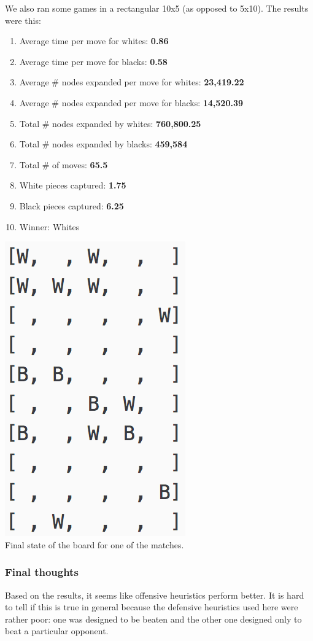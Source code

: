 \documentclass[11pt]{article}
\begin{document}
We also ran some games in a rectangular 10x5 (as opposed to 5x10). The results were this:
\begin{enumerate}
\item Average time per move for whites: \textbf{0.86}
\item Average time per move for blacks: \textbf{0.58}
\item Average \# nodes expanded per move for whites: \textbf{23,419.22}
\item Average \# nodes expanded per move for blacks:  \textbf{14,520.39}
\item Total \# nodes expanded by whites: \textbf{760,800.25}
\item Total \# nodes expanded by blacks: \textbf{459,584}
\item Total \# of moves: \textbf{65.5}
\item White pieces captured: \textbf{1.75}
\item Black pieces captured: \textbf{6.25}
\item Winner: Whites
\end{enumerate}
\begin{center}
\includegraphics[scale=1]{part2/ab-o1-vs-ab-d1-rect10x5.png}\\
Final state of the board for one of the matches.
\end{center}

\subsubsection*{Final thoughts}
Based on the results, it seems like offensive heuristics perform better. It is hard to tell if this is true in general because the defensive heuristics used here were rather poor: one was designed to be beaten and the other one designed only to beat a particular opponent.\\
\end{document}
